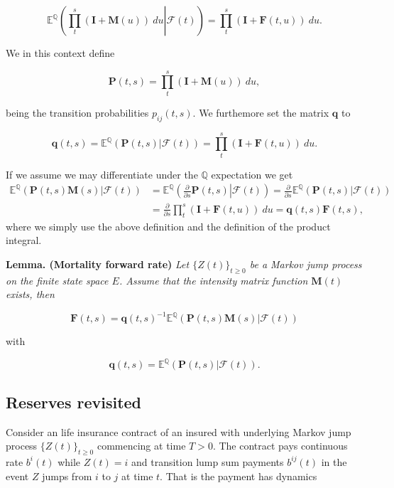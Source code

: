 \documentclass[
]{book}
\begin{document}
\[
\mathbb E^{\mathbb Q}\left(\left.\prod_t^s(\mathbf I+\mathbf M(u))\ du\right\vert \mathcal F (t)\right)=\prod_t^s(\mathbf I+\mathbf F(t,u))\ du.
\]

We in this context define

\[
\mathbf P(t,s)=\prod_t^s(\mathbf I+\mathbf M(u))\ du,
\]

being the transition probabilities \(p_{ij}(t,s)\). We furthemore set the matrix \(\mathbf q\) to

\[
\mathbf q(t,s)=\mathbb E^{\mathbb Q}\left(\left.\mathbf P(t,s)\right\vert \mathcal F (t)\right)=\prod_t^s(\mathbf I+\mathbf F(t,u))\ du.
\]

If we assume we may differentiate under the \(\mathbb Q\) expectation we get
\begin{align*}
\mathbb E^{\mathbb Q}\left(\left.\mathbf P(t,s)\mathbf M(s)\right\vert \mathcal F (t)\right)&=\mathbb E^{\mathbb Q}\left(\left.\frac{\partial}{\partial s}\mathbf P(t,s)\right\vert \mathcal F (t)\right)=\frac{\partial}{\partial s}\mathbb E^{\mathbb Q}\left(\left.\mathbf P(t,s)\right\vert \mathcal F (t)\right)\\
&=\frac{\partial}{\partial s}\prod_t^s(\mathbf I+\mathbf F(t,u))\ du=\mathbf q(t,s)\mathbf F(t,s),
\end{align*}
where we simply use the above definition and the definition of the product integral.

\textbf{Lemma. (Mortality forward rate)} \emph{Let \(\{Z(t)\}_{t\ge 0}\) be a Markov jump process on the finite state space \(E\). Assume that the intensity matrix function \(\mathbf M(t)\) exists, then}

\[
\mathbf F(t,s)=\mathbf q(t,s)^{-1}\mathbb E^{\mathbb Q}\left(\left.\mathbf P(t,s)\mathbf M(s)\right\vert \mathcal F (t)\right)
\]

with

\[
\mathbf q(t,s) = \mathbb E^{\mathbb Q}\left(\left.\mathbf P(t,s)\right\vert \mathcal F (t)\right).
\]

\hypertarget{reserves-revisited}{%
\subsection{Reserves revisited}\label{reserves-revisited}}

Consider an life insurance contract of an insured with underlying Markov jump process \(\{Z(t)\}_{t\ge 0}\) commencing at time \(T>0\). The contract pays continuous rate \(b^i(t)\) while \(Z(t)= i\) and transition lump sum payments \(b^{ij}(t)\) in the event \(Z\) jumps from \(i\) to \(j\) at time \(t\). That is the payment has dynamics
\end{document}

